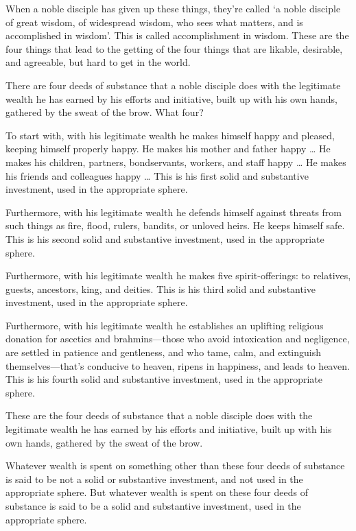 \documentclass[12pt,openany]{book}%
\begin{document}
When a noble disciple has given up these things, they’re called ‘a noble disciple of great wisdom, of widespread wisdom, who sees what matters, and is accomplished in wisdom’. This is called accomplishment in wisdom. These are the four things that lead to the getting of the four things that are likable, desirable, and agreeable, but hard to get in the world. 

There are four deeds of substance that a noble disciple does with the legitimate wealth he has earned by his efforts and initiative, built up with his own hands, gathered by the sweat of the brow. What four? 

To start with, with his legitimate wealth he makes himself happy and pleased, keeping himself properly happy. He makes his mother and father happy … He makes his children, partners, bondservants, workers, and staff happy … He makes his friends and colleagues happy … This is his first solid and substantive investment, used in the appropriate sphere. 

Furthermore, with his legitimate wealth he defends himself against threats from such things as fire, flood, rulers, bandits, or unloved heirs. He keeps himself safe. This is his second solid and substantive investment, used in the appropriate sphere. 

Furthermore, with his legitimate wealth he makes five spirit-offerings: to relatives, guests, ancestors, king, and deities. This is his third solid and substantive investment, used in the appropriate sphere. 

Furthermore, with his legitimate wealth he establishes an uplifting religious donation for ascetics and brahmins—those who avoid intoxication and negligence, are settled in patience and gentleness, and who tame, calm, and extinguish themselves—that’s conducive to heaven, ripens in happiness, and leads to heaven. This is his fourth solid and substantive investment, used in the appropriate sphere. 

These are the four deeds of substance that a noble disciple does with the legitimate wealth he has earned by his efforts and initiative, built up with his own hands, gathered by the sweat of the brow. 

Whatever wealth is spent on something other than these four deeds of substance is said to be not a solid or substantive investment, and not used in the appropriate sphere. But whatever wealth is spent on these four deeds of substance is said to be a solid and substantive investment, used in the appropriate sphere. 
\end{document}
